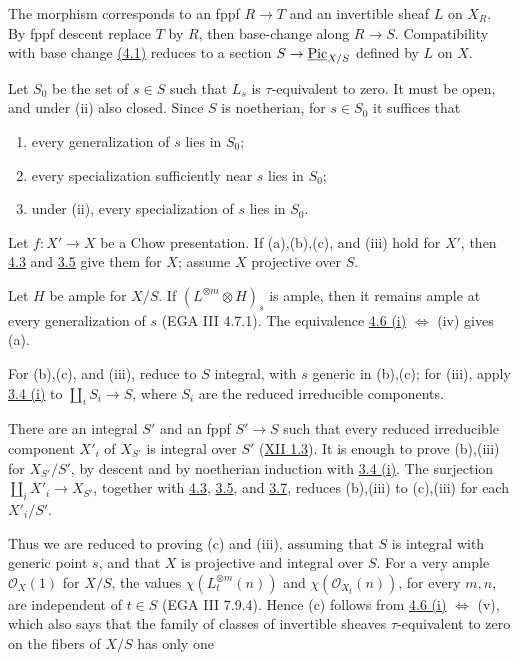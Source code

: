 The morphism corresponds to an fppf \(R\to T\) and an invertible sheaf
\(L\) on \(X_R\). By fppf descent replace \(T\) by \(R\), then base-change
along \(R\to S\). Compatibility with base change \hyperlink{sga6.e13.para.4-1}{(4.1)} reduces to a
section \(S\to\underline{\operatorname{Pic}}_{X/S}\) defined by \(L\) on \(X\).

Let \(S_0\) be the set of \(s\in S\) such that \(L_s\) is
\(\tau\)-equivalent to zero. It must be open, and under (ii) also closed.
Since \(S\) is noetherian, for \(s\in S_0\) it suffices that
\begin{enumerate}[label=(\alph*)]
\item every generalization of \(s\) lies in \(S_0\);
\item every specialization sufficiently near \(s\) lies in \(S_0\);
\item under (ii), every specialization of \(s\) lies in \(S_0\).
\end{enumerate}

Let \(f:X'\to X\) be a Chow presentation. If (a),(b),(c), and (iii) hold
for \(X'\), then \hyperlink{sga6.e13.lem.4-3}{4.3} and \hyperlink{sga6.e13.thm.3-5}{3.5} give them for \(X\); assume \(X\) projective
over \(S\).

Let \(H\) be ample for \(X/S\). If
\((L^{\otimes m}\otimes H)_s\) is ample, then it remains ample at every
generalization of \(s\) (EGA III 4.7.1). The equivalence \hyperlink{sga6.e13.thm.4-6}{4.6
(i)} \(\Longleftrightarrow\) (iv) gives (a).

For (b),(c), and (iii), reduce to \(S\) integral, with \(s\) generic in
(b),(c); for (iii), apply \hyperlink{sga6.e13.lem.3-4}{3.4 (i)} to
\(\coprod_iS_i\to S\), where \(S_i\) are the reduced irreducible
components.

There are an integral \(S'\) and an fppf \(S'\to S\) such that every
reduced irreducible component \(X'_i\) of \(X_{S'}\) is integral over
\(S'\) (\hyperlink{sga6.e12.lem.1-3}{XII 1.3}). It is enough to prove (b),(iii) for \(X_{S'}/S'\), by
descent and by noetherian induction with \hyperlink{sga6.e13.lem.3-4}{3.4 (i)}. The surjection
\(\coprod_iX'_i\to X_{S'}\), together with \hyperlink{sga6.e13.lem.4-3}{4.3}, \hyperlink{sga6.e13.thm.3-5}{3.5}, and \hyperlink{sga6.e13.lem.3-7}{3.7}, reduces
(b),(iii) to (c),(iii) for each \(X'_i/S'\).

Thus we are reduced to proving (c) and (iii), assuming that \(S\) is
integral with generic point \(s\), and that \(X\) is projective and
integral over \(S\). For a very ample \(\mathcal O_X(1)\) for \(X/S\),
the values \(\chi(L_t^{\otimes m}(n))\) and
\(\chi(\mathcal O_{X_t}(n))\), for every \(m,n\), are independent of
\(t\in S\) (EGA III 7.9.4). Hence (c) follows from \hyperlink{sga6.e13.thm.4-6}{4.6
(i)} \(\Longleftrightarrow\) (v), which also says that the family of
classes of invertible sheaves \(\tau\)-equivalent to zero on the fibers
of \(X/S\) has only one

